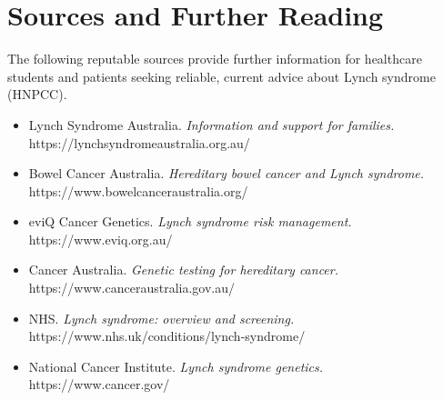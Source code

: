 \section*{Sources and Further Reading}
The following reputable sources provide further information for healthcare students and patients seeking reliable, current advice about Lynch syndrome (HNPCC).

\begin{itemize}
    \item Lynch Syndrome Australia. \textit{Information and support for families.} https://lynchsyndromeaustralia.org.au/
    \item Bowel Cancer Australia. \textit{Hereditary bowel cancer and Lynch syndrome.} https://www.bowelcanceraustralia.org/
    \item eviQ Cancer Genetics. \textit{Lynch syndrome risk management.} https://www.eviq.org.au/
    \item Cancer Australia. \textit{Genetic testing for hereditary cancer.} https://www.canceraustralia.gov.au/
    \item NHS. \textit{Lynch syndrome: overview and screening.} https://www.nhs.uk/conditions/lynch-syndrome/
    \item National Cancer Institute. \textit{Lynch syndrome genetics.} https://www.cancer.gov/
\end{itemize}
